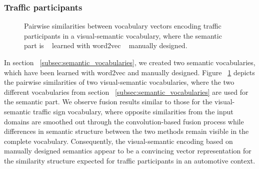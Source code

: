 \subsubsection{Traffic participants}%
\label{ssubsec:traffic_participants}

\begin{figure}[t]
    \centering
    \caption{Pairwise similarities between vocabulary vectors encoding traffic participants in a visual-semantic vocabulary, where the semantic part is  ~\protect{} learned with word2vec ~\protect{} manually designed.}
    \label{fig:visual_semantic_vocab_traffic_participants_internal_similarities}
\end{figure}

In section ~\ref{subsec:semantic_vocabularies}, we created two semantic vocabularies, which have been learned with word2vec and manually designed.
Figure ~\ref{fig:visual_semantic_vocab_traffic_participants_internal_similarities} depicts the pairwise similarities of two visual-semantic vocabularies, where the two different vocabularies from section ~\ref{subsec:semantic_vocabularies} are used for the semantic part.
We observe fusion results similar to those for the visual-semantic traffic sign vocabulary, where opposite similarities from the input domains are smoothed out through the convolution-based fusion process while differences in semantic structure between the two methods remain visible in the complete vocabulary.
Consequently, the visual-semantic encoding based on manually designed semantics appear to be a convincing vector representation for the similarity structure expected for traffic participants in an automotive context.

